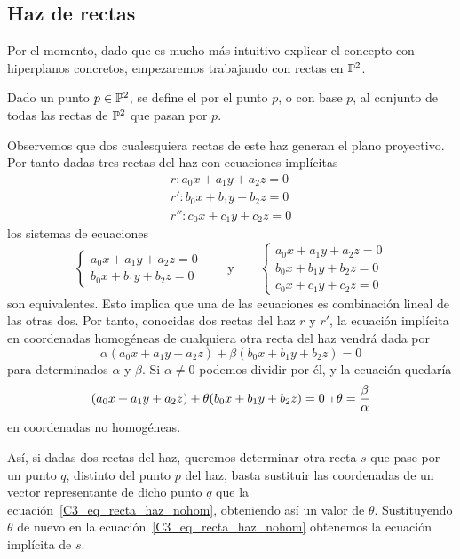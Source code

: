 \subsection{Haz de rectas}
Por el momento, dado que es mucho más intuitivo explicar el concepto  con hiperplanos concretos, empezaremos trabajando con rectas en $\mathbb{P}^2$.
\begin{defi}
	Dado un punto $p\in\mathbb{P}^2$, se define el  por el punto $p$, o con base $p$, al conjunto de todas las rectas de $\mathbb{P}^2$ que pasan por $p$.
\end{defi}
Observemos que dos cualesquiera rectas de este haz generan el plano proyectivo. Por tanto dadas tres rectas del haz con ecuaciones implícitas
\begin{equation}
	\label{C3_eq_implicitas_rectas_haz}
	\begin{split}
		r:a_0x+a_1y+a_2z=0\\
		r':b_0x+b_1y+b_2z=0\\
		r'':c_0x+c_1y+c_2z=0
	\end{split}
\end{equation}
los sistemas de ecuaciones 
\begin{equation}
	\begin{cases}
	a_0x+a_1y+a_2z=0\\
	b_0x+b_1y+b_2z=0
	\end{cases} \qquad \text{y} \qquad \begin{cases}
	a_0x+a_1y+a_2z=0\\
	b_0x+b_1y+b_2z=0\\
	c_0x+c_1y+c_2z=0
	\end{cases}
\end{equation}
son equivalentes. Esto implica que una de las ecuaciones es combinación lineal de las otras dos. Por tanto, conocidas dos rectas del haz $r$ y $r'$, la ecuación implícita en coordenadas homogéneas de cualquiera otra recta del haz vendrá dada por
\begin{equation}
	\label{C3_eq_recta_haz}
	\alpha(a_0x+a_1y+a_2z)+\beta(b_0x+b_1y+b_2z)=0
\end{equation}
para determinados $\alpha$ y $\beta$. Si $\alpha\not=0$ podemos dividir por él, y la ecuación quedaría
\begin{equation}
	\label{C3_eq_recta_haz_nohom}
	(a_0x+a_1y+a_2z)+\theta(b_0x+b_1y+b_2z)=0\shortparallel \theta=\frac{\beta}{\alpha}
\end{equation}
en coordenadas no homogéneas. 

Así, si dadas dos rectas del haz, queremos determinar otra recta $s$ que pase por un punto $q$, distinto del punto $p$ del haz, basta sustituir las coordenadas de un vector representante de dicho punto $q$ que la ecuación~\eqref{C3_eq_recta_haz_nohom}, obteniendo así un valor de $\theta$. Sustituyendo $\theta$ de nuevo en la ecuación~\eqref{C3_eq_recta_haz_nohom} obtenemos la ecuación implícita de $s$.\\

